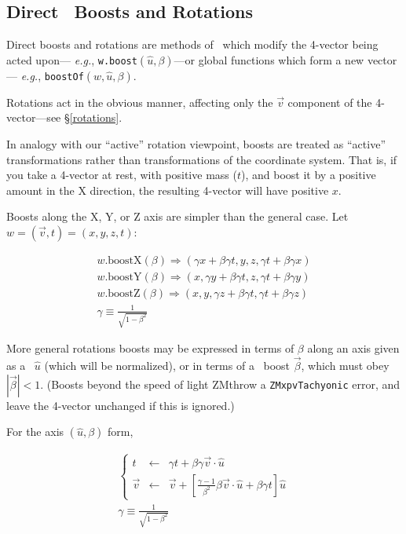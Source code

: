 \subsection{Direct \protect\LV\ Boosts and Rotations}

Direct boosts and rotations are methods of \LV\ which
modify the 4-vector being acted
upon--- {\it e.g.}, {\tt w.boost}$(\hat{u}, \beta)$---or
global functions which form a new
vector--- {\it e.g.}, {\tt boostOf}$(w, \hat{u}, \beta)$.

Rotations act in the obvious manner, affecting only the $\vec{v}$ component of
the 4-vector---see \S\ref{rotations}.

In analogy with our ``active'' rotation viewpoint, boosts are treated as
``active'' transformations rather than transformations of the coordinate system.
That is, if you take a 4-vector at rest, with positive mass ($t$),
and boost it by a positive amount in the X direction, the resulting 4-vector
will have positive $x$.

Boosts along the X, Y, or Z axis are simpler than the general case.
Let $w = (\vec{v}, t) = (x, y, z, t)$:

\begin{eqnarray}
\label{eq:wbX}
  w.\mbox{boostX} (\beta) \Longrightarrow
    ( \gamma x + \beta \gamma t, y, z, \gamma t + \beta \gamma x ) \\
\label{eq:wbY}
  w.\mbox{boostY} (\beta) \Longrightarrow
    ( x, \gamma y + \beta \gamma t, z, \gamma t + \beta \gamma y ) \\
\label{eq:wbZ}
  w.\mbox{boostZ} (\beta) \Longrightarrow
    ( x, y, \gamma z + \beta \gamma t, \gamma t + \beta \gamma z ) \\
  \gamma \equiv \frac{1}{\sqrt{1-\beta^2}} \nonumber
\end{eqnarray}


More general rotations boosts may be expressed in terms of
$\beta$ along an axis given as a \SV\ $\hat{u}$ (which will be normalized),
or in terms of a \SV\ boost $\vec{\beta}$, which must obey $|\vec{\beta}|<1$.
(Boosts beyond the speed of light ZMthrow a
{\tt ZMxpvTachyonic} error, and leave the 4-vector unchanged
if this is ignored.)

For the axis $(\hat{u}, \beta)$ form,

\begin{eqnarray}
\label{eq:pureboost}
  \left\{
  \begin{array}{lcl}
  t & \longleftarrow & \gamma t + \beta \gamma \vec{v} \cdot \hat{u} \\
  \vec{v} & \longleftarrow & \vec{v} + \left[
	\frac{\gamma-1}{\beta^2} \beta \vec{v} \cdot \hat{u}  +
	\beta \gamma t \right] \hat{u}
  \end{array}
  \right. \\
  \gamma \equiv \frac{1}{\sqrt{1-\beta^2}} \nonumber
\end{eqnarray}

